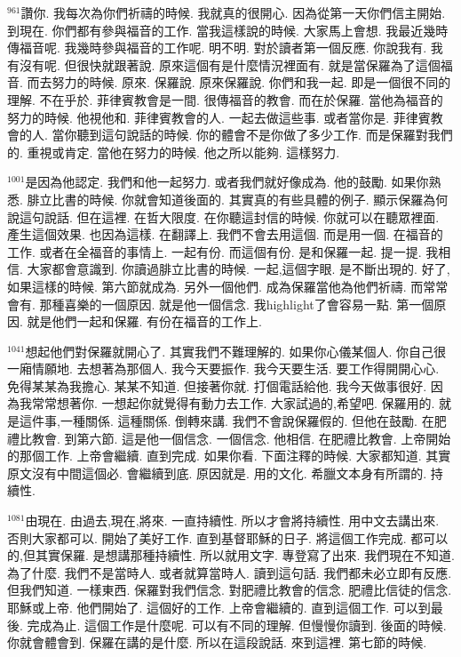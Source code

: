 \documentclass{book}
\begin{document}
$^{961}$讚你.
我每次為你們祈禱的時候.
我就真的很開心.
因為從第一天你們信主開始.
到現在.
你們都有參與福音的工作.
當我這樣說的時候.
大家馬上會想.
我最近幾時傳福音呢.
我幾時參與福音的工作呢.
明不明.
對於讀者第一個反應.
你說我有.
我有沒有呢.
但很快就跟著說.
原來這個有是什麼情況裡面有.
就是當保羅為了這個福音.
而去努力的時候.
原來.
保羅說.
原來保羅說.
你們和我一起.
即是一個很不同的理解.
不在乎於.
菲律賓教會是一間.
很傳福音的教會.
而在於保羅.
當他為福音的努力的時候.
他視他和.
菲律賓教會的人.
一起去做這些事.
或者當你是.
菲律賓教會的人.
當你聽到這句說話的時候.
你的體會不是你做了多少工作.
而是保羅對我們的.
重視或肯定.
當他在努力的時候.
他之所以能夠.
這樣努力.

$^{1001}$是因為他認定.
我們和他一起努力.
或者我們就好像成為.
他的鼓勵.
如果你熟悉.
腓立比書的時候.
你就會知道後面的.
其實真的有些具體的例子.
顯示保羅為何說這句說話.
但在這裡.
在哲大限度.
在你聽這封信的時候.
你就可以在聽眾裡面.
產生這個效果.
也因為這樣.
在翻譯上.
我們不會去用這個.
而是用一個.
在福音的工作.
或者在全福音的事情上.
一起有份.
而這個有份.
是和保羅一起.
提一提.
我相信.
大家都會意識到.
你讀過腓立比書的時候.
一起,這個字眼.
是不斷出現的.
好了,如果這樣的時候.
第六節就成為.
另外一個他們.
成為保羅當他為他們祈禱.
而常常會有.
那種喜樂的一個原因.
就是他一個信念.
我highlight了會容易一點.
第一個原因.
就是他們一起和保羅.
有份在福音的工作上.

$^{1041}$想起他們對保羅就開心了.
其實我們不難理解的.
如果你心儀某個人.
你自己很一廂情願地.
去想著為那個人.
我今天要振作.
我今天要生活.
要工作得開開心心.
免得某某為我擔心.
某某不知道.
但接著你就.
打個電話給他.
我今天做事很好.
因為我常常想著你.
一想起你就覺得有動力去工作.
大家試過的,希望吧.
保羅用的.
就是這件事,一種關係.
這種關係.
倒轉來講.
我們不會說保羅假的.
但他在鼓勵.
在肥禮比教會.
到第六節.
這是他一個信念.
一個信念.
他相信.
在肥禮比教會.
上帝開始的那個工作.
上帝會繼續.
直到完成.
如果你看.
下面注釋的時候.
大家都知道.
其實原文沒有中間這個必.
會繼續到底.
原因就是.
用的文化.
希臘文本身有所謂的.
持續性.

$^{1081}$由現在.
由過去,現在,將來.
一直持續性.
所以才會將持續性.
用中文去講出來.
否則大家都可以.
開始了美好工作.
直到基督耶穌的日子.
將這個工作完成.
都可以的,但其實保羅.
是想講那種持續性.
所以就用文字.
專登寫了出來.
我們現在不知道.
為了什麼.
我們不是當時人.
或者就算當時人.
讀到這句話.
我們都未必立即有反應.
但我們知道.
一樣東西.
保羅對我們信念.
對肥禮比教會的信念.
肥禮比信徒的信念.
耶穌或上帝.
他們開始了.
這個好的工作.
上帝會繼續的.
直到這個工作.
可以到最後.
完成為止.
這個工作是什麼呢.
可以有不同的理解.
但慢慢你讀到.
後面的時候.
你就會體會到.
保羅在講的是什麼.
所以在這段說話.
來到這裡.
第七節的時候.
\end{document}
